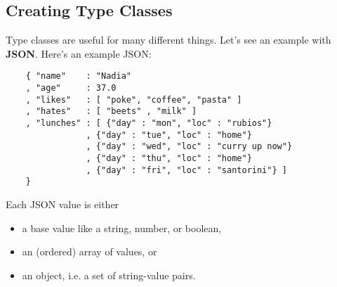 \documentclass[letterpaper]{article}
\begin{document}
\subsection{Creating Type Classes}
Type classes are useful for many different things. Let's see an example with \textbf{JSON}. Here's an example JSON: 
\begin{verbatim}
    { "name"    : "Nadia"
    , "age"     : 37.0
    , "likes"   : [ "poke", "coffee", "pasta" ]
    , "hates"   : [ "beets" , "milk" ]
    , "lunches" : [ {"day" : "mon", "loc" : "rubios"}
                , {"day" : "tue", "loc" : "home"}
                , {"day" : "wed", "loc" : "curry up now"}
                , {"day" : "thu", "loc" : "home"}
                , {"day" : "fri", "loc" : "santorini"} ]
    }\end{verbatim}
Each JSON value is either 
\begin{itemize}
    \item a base value like a string, number, or boolean,
    \item an (ordered) array of values, or 
    \item an object, i.e. a set of string-value pairs. 
\end{itemize}
\end{document}
